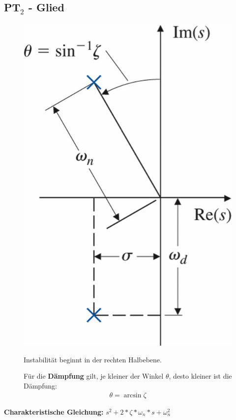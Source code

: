 \subsection{PT$_2$ - Glied}
\begin{tcolorbox}[colback=white!10!white,
                  colframe=green!30!black,
                  title=PT$_2$ - Glied] 
    \begin{figure}[H]
        \begin{minipage}{.3\textwidth}
            \centering
            \includegraphics[width=1\textwidth]{images/winkel}
        \end{minipage}%
        \hspace{1cm}
        \begin{minipage}{.6\textwidth}
            Instabilität beginnt in der rechten Halbebene. 
            
            Für die  \textbf{Dämpfung} gilt, je kleiner der Winkel $\theta$, desto kleiner ist die Dämpfung: \begin{align*}
                \theta = \arcsin{\zeta}
            \end{align*}
        \end{minipage}%
        
    \end{figure}
    \textbf{Charakteristische Gleichung:} $s^2+2*\zeta*\omega_n*s+\omega_n^2$
\end{tcolorbox}

